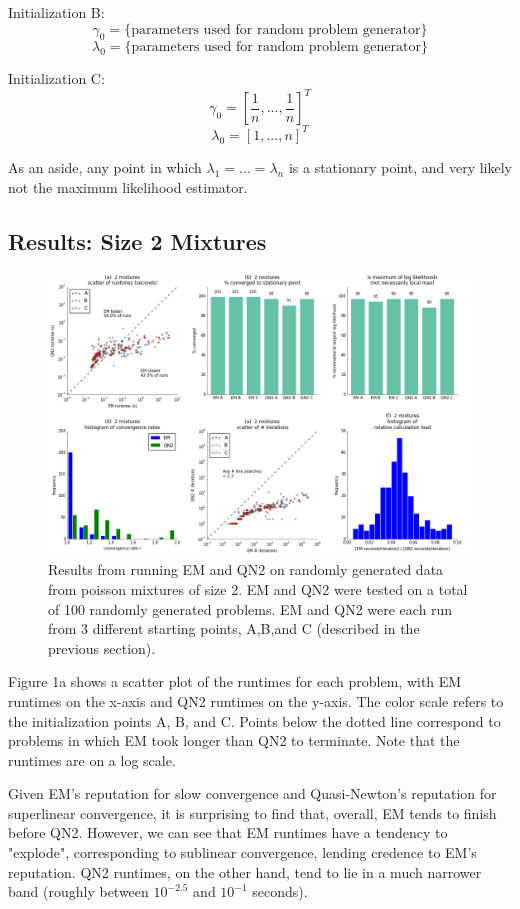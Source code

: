 \documentclass[letter,12pt]{article}
\begin{document}
Initialization B:
\[
\gamma_0 = \{\text{parameters used for random problem generator}\}
\]
\[
\lambda_0 = \{\text{parameters used for random problem generator}\}
\]

Initialization C:
\[
\gamma_0 = [\frac{1}{n},...,\frac{1}{n}]^T
\]
\[
\lambda_0 = [1,...,n]^T
\]

As an aside, any point in which $\lambda_1 = \dots = \lambda_n$ is a stationary point, and very likely not the maximum likelihood estimator.

\pagebreak
\subsection{Results: Size 2 Mixtures}

\begin{figure}[h]
\centering
\includegraphics[width=16cm]{fig_RunData2_K2_init3.png}
\caption{Results from running EM and QN2 on randomly generated data from poisson mixtures of size 2.  EM and QN2 were tested on a total of 100 randomly generated problems.  EM and QN2 were each run from 3 different starting points, A,B,and C (described in the previous section).}
\end{figure}

Figure 1a shows a scatter plot of the runtimes for each problem, with EM runtimes on the x-axis and QN2 runtimes on the y-axis.  The color scale refers to the initialization points A, B, and C.  Points below the dotted line correspond to problems in which EM took longer than QN2 to terminate.  Note that the runtimes are on a log scale.  

Given EM's reputation for slow convergence and Quasi-Newton's reputation for superlinear convergence, it is surprising to find that, overall, EM tends to finish before QN2.  However, we can see that EM runtimes have a tendency to "explode", corresponding to sublinear convergence, lending credence to EM's reputation.  QN2 runtimes, on the other hand, tend to lie in a much narrower band (roughly between $10^{-2.5}$ and $10^{-1}$ seconds).
\end{document}
